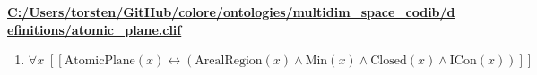 \documentclass{article}
\begin{document}
\textbf{\url{C:/Users/torsten/GitHub/colore/ontologies/multidim\_space\_codib/definitions/atomic\_plane.clif}}

\begin{enumerate}
\item $\forall x\;  \left[ \left[ \textrm{AtomicPlane}(x) \leftrightarrow \left(\textrm{ArealRegion}(x) \land \textrm{Min}(x) \land \textrm{Closed}(x) \land \textrm{ICon}(x)\right) \right] \right]$
\end{enumerate}
\end{document}
